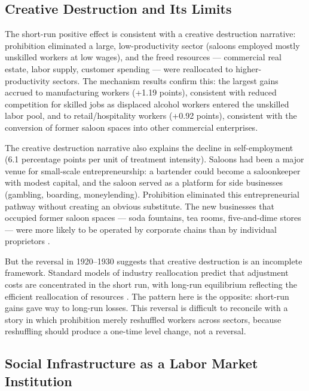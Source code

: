 \documentclass[12pt]{article}
\begin{document}
\subsection{Creative Destruction and Its Limits}

The short-run positive effect is consistent with a creative destruction narrative: prohibition eliminated a large, low-productivity sector (saloons employed mostly unskilled workers at low wages), and the freed resources --- commercial real estate, labor supply, customer spending --- were reallocated to higher-productivity sectors. The mechanism results confirm this: the largest gains accrued to manufacturing workers (+1.19 points), consistent with reduced competition for skilled jobs as displaced alcohol workers entered the unskilled labor pool, and to retail/hospitality workers (+0.92 points), consistent with the conversion of former saloon spaces into other commercial enterprises.

The creative destruction narrative also explains the decline in self-employment (6.1 percentage points per unit of treatment intensity). Saloons had been a major venue for small-scale entrepreneurship: a bartender could become a saloonkeeper with modest capital, and the saloon served as a platform for side businesses (gambling, boarding, moneylending). Prohibition eliminated this entrepreneurial pathway without creating an obvious substitute. The new businesses that occupied former saloon spaces --- soda fountains, tea rooms, five-and-dime stores --- were more likely to be operated by corporate chains than by individual proprietors \citep{okrent2010}.

But the reversal in 1920--1930 suggests that creative destruction is an incomplete framework. Standard models of industry reallocation predict that adjustment costs are concentrated in the short run, with long-run equilibrium reflecting the efficient reallocation of resources \citep{blanchard1992}. The pattern here is the opposite: short-run gains gave way to long-run losses. This reversal is difficult to reconcile with a story in which prohibition merely reshuffled workers across sectors, because reshuffling should produce a one-time level change, not a reversal.

\subsection{Social Infrastructure as a Labor Market Institution}
\end{document}
